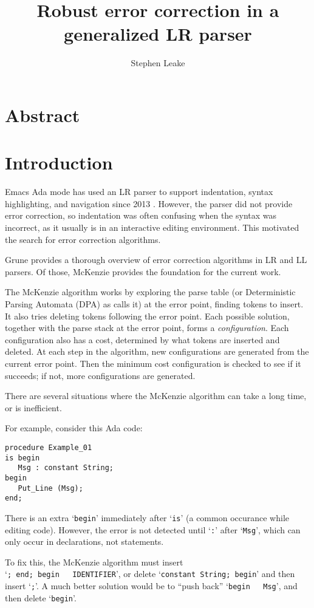 \documentclass{article}
\title{Robust error correction in a generalized LR parser}
\author{Stephen Leake}
\newcommand{\code}[1]{`\lstinline|#1|'}
\begin{document}
\section{Abstract}

\section{Introduction}
Emacs Ada mode has used an LR parser to support indentation, syntax
highlighting, and navigation since 2013 \cite{Emacs Ada mode news}.
However, the parser did not provide error correction, so indentation
was often confusing when the syntax was incorrect, as it usually is in
an interactive editing environment. This motivated the search for
error correction algorithms.

Grune \cite{Grune 2008} provides a thorough overview of error
correction algorithms in LR and LL parsers. Of those, McKenzie
\cite{McKenzie 1995} provides the foundation for the current work.

The McKenzie algorithm works by exploring the parse table (or
Deterministic Parsing Automata (DPA) as \cite{McKenzie 1995} calls it)
at the error point, finding tokens to insert. It also tries deleting
tokens following the error point. Each possible solution, together
with the parse stack at the error point, forms a
\textit{configuration}. Each configuration also has a cost, determined
by what tokens are inserted and deleted. At each step in the
algorithm, new configurations are generated from the current error
point. Then the minimum cost configuration is checked to see if it
succeeds; if not, more configurations are generated.

There are several situations where the McKenzie algorithm can take a
long time, or is inefficient.

For example, consider this Ada code:
\begin{lstlisting}
procedure Example_01
is begin
   Msg : constant String;
begin
   Put_Line (Msg);
end;
\end{lstlisting}

There is an extra \code{begin} immediately after \code{is} (a common
occurance while editing code). However, the error is not detected
until \code{:} after \code{Msg}, which can only occur in declarations,
not statements.

To fix this, the McKenzie algorithm must insert\\ \code{; end; begin
  IDENTIFIER}, or delete \code{constant String; begin} and then insert
\code{;}. A much better solution would be to ``push back'' \code{begin
  Msg}, and then delete \code{begin}.
\end{document}
